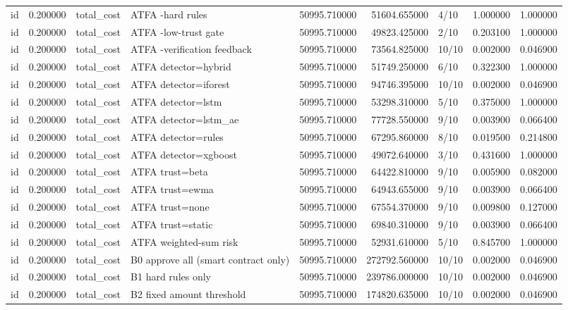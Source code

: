 \begin{tabular}{lrllrrlrr}
id & 0.200000 & total\_cost & ATFA -hard rules & 50995.710000 & 51604.655000 & 4/10 & 1.000000 & 1.000000 \\
id & 0.200000 & total\_cost & ATFA -low-trust gate & 50995.710000 & 49823.425000 & 2/10 & 0.203100 & 1.000000 \\
id & 0.200000 & total\_cost & ATFA -verification feedback & 50995.710000 & 73564.825000 & 10/10 & 0.002000 & 0.046900 \\
id & 0.200000 & total\_cost & ATFA detector=hybrid & 50995.710000 & 51749.250000 & 6/10 & 0.322300 & 1.000000 \\
id & 0.200000 & total\_cost & ATFA detector=iforest & 50995.710000 & 94746.395000 & 10/10 & 0.002000 & 0.046900 \\
id & 0.200000 & total\_cost & ATFA detector=lstm & 50995.710000 & 53298.310000 & 5/10 & 0.375000 & 1.000000 \\
id & 0.200000 & total\_cost & ATFA detector=lstm\_ae & 50995.710000 & 77728.550000 & 9/10 & 0.003900 & 0.066400 \\
id & 0.200000 & total\_cost & ATFA detector=rules & 50995.710000 & 67295.860000 & 8/10 & 0.019500 & 0.214800 \\
id & 0.200000 & total\_cost & ATFA detector=xgboost & 50995.710000 & 49072.640000 & 3/10 & 0.431600 & 1.000000 \\
id & 0.200000 & total\_cost & ATFA trust=beta & 50995.710000 & 64422.810000 & 9/10 & 0.005900 & 0.082000 \\
id & 0.200000 & total\_cost & ATFA trust=ewma & 50995.710000 & 64943.655000 & 9/10 & 0.003900 & 0.066400 \\
id & 0.200000 & total\_cost & ATFA trust=none & 50995.710000 & 67554.370000 & 9/10 & 0.009800 & 0.127000 \\
id & 0.200000 & total\_cost & ATFA trust=static & 50995.710000 & 69840.310000 & 9/10 & 0.003900 & 0.066400 \\
id & 0.200000 & total\_cost & ATFA weighted-sum risk & 50995.710000 & 52931.610000 & 5/10 & 0.845700 & 1.000000 \\
id & 0.200000 & total\_cost & B0 approve all (smart contract only) & 50995.710000 & 272792.560000 & 10/10 & 0.002000 & 0.046900 \\
id & 0.200000 & total\_cost & B1 hard rules only & 50995.710000 & 239786.000000 & 10/10 & 0.002000 & 0.046900 \\
id & 0.200000 & total\_cost & B2 fixed amount threshold & 50995.710000 & 174820.635000 & 10/10 & 0.002000 & 0.046900 \\

\end{tabular}
